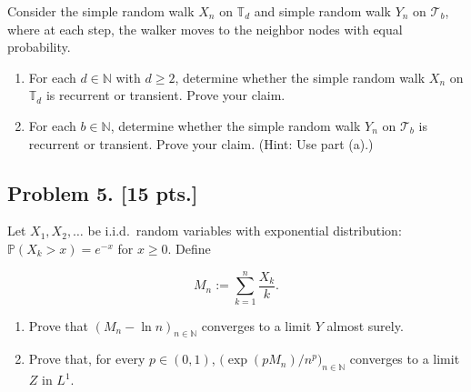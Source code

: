 \documentclass[11pt,a4paper]{article}
\begin{document}
Consider the simple random walk \( X_n \) on \( \mathbb{T}_d \) and simple random walk \( Y_n \) on \( \mathcal{T}_b \), where at each step, the walker moves to the neighbor nodes with equal probability.
\begin{enumerate}[label=(\alph*)]
    \item For each \( d \in \mathbb{N} \) with \( d \ge 2 \), determine whether the simple random walk \( X_n \) on \( \mathbb{T}_d \) is recurrent or transient. Prove your claim.
    \item For each \( b \in \mathbb{N} \), determine whether the simple random walk \( Y_n \) on \( \mathcal{T}_b \) is recurrent or transient. Prove your claim. (Hint: Use part (a).)
\end{enumerate}

\subsection{Problem 5. [15 pts.]}
Let \( X_1, X_2, \dots \) be i.i.d.\ random variables with exponential distribution: \( \mathbb{P}(X_k > x) = e^{-x} \) for \( x \ge 0 \). Define

\[
M_n := \sum_{k=1}^n \frac{X_k}{k}.
\]

\begin{enumerate}[label=(\alph*)]
    \item Prove that \( (M_n - \ln n)_{n \in \mathbb{N}} \) converges to a limit \( Y \) almost surely.
    \item Prove that, for every \( p \in (0, 1) \), \( \bigl( \exp(p M_n)/n^p \bigr)_{n \in \mathbb{N}} \) converges to a limit \( Z \) in \( L^1 \).
\end{enumerate}
\end{document}
